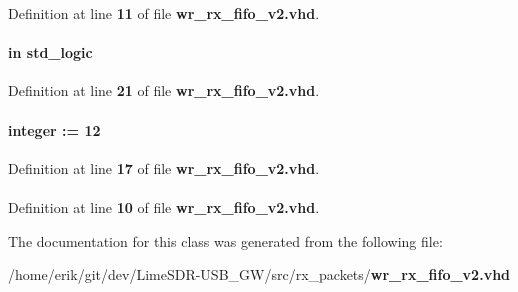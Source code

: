 Definition at line {\bf 11} of file {\bf wr\+\_\+rx\+\_\+fifo\+\_\+v2.\+vhd}.

\paragraph[{reset\+\_\+n}]{ {\bfseries \textcolor{keywordflow}{in}\textcolor{vhdlchar}{ }} {\bfseries \textcolor{comment}{std\+\_\+logic}\textcolor{vhdlchar}{ }} \hspace{0.3cm}{\ttfamily [Port]}}\label{classwr__rx__fifo__v2_a446ea52ed8c4a84181a47d9165ce41a5}


Definition at line {\bf 21} of file {\bf wr\+\_\+rx\+\_\+fifo\+\_\+v2.\+vhd}.

\paragraph[{sample\+\_\+wdth}]{ {\bfseries \textcolor{vhdlchar}{ }} {\bfseries \textcolor{comment}{integer}\textcolor{vhdlchar}{ }\textcolor{vhdlchar}{ }\textcolor{vhdlchar}{\+:}\textcolor{vhdlchar}{=}\textcolor{vhdlchar}{ }\textcolor{vhdlchar}{ } \textcolor{vhdldigit}{12} \textcolor{vhdlchar}{ }} \hspace{0.3cm}{\ttfamily [Generic]}}\label{classwr__rx__fifo__v2_acefb9139c73c3415d9f58adac9027cf3}


Definition at line {\bf 17} of file {\bf wr\+\_\+rx\+\_\+fifo\+\_\+v2.\+vhd}.

\paragraph[{std\+\_\+logic\+\_\+1164}]{\hspace{0.3cm}{\ttfamily [Package]}}\label{classwr__rx__fifo__v2_acd03516902501cd1c7296a98e22c6fcb}


Definition at line {\bf 10} of file {\bf wr\+\_\+rx\+\_\+fifo\+\_\+v2.\+vhd}.



The documentation for this class was generated from the following file\+:\begin{DoxyCompactItemize}
\item 
/home/erik/git/dev/\+Lime\+S\+D\+R-\/\+U\+S\+B\+\_\+\+G\+W/src/rx\+\_\+packets/{\bf wr\+\_\+rx\+\_\+fifo\+\_\+v2.\+vhd}\end{DoxyCompactItemize}
